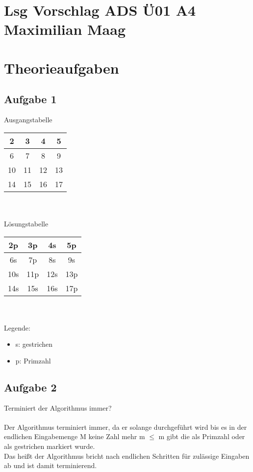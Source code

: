 \documentclass{article}
\begin{document}
	\section*{Lsg Vorschlag ADS Ü01 A4 Maximilian Maag}
	\section*{Theorieaufgaben}
	\subsection*{Aufgabe 1}
	Ausgangstabelle \\
	\begin{tabular}[h]{|c|c|c|c|}
		\hline
		2 & 3 & 4 & 5 \\
		\hline
		6 & 7 & 8 & 9 \\
		\hline
		10 & 11 & 12 & 13 \\
		\hline
		14 & 15 & 16 & 17 \\
		\hline
		
	\end{tabular} \\ \\

	Lösungstabelle \\
	\begin{tabular}[h]{|c|c|c|c|}
		\hline
		2p & 3p & 4s & 5p \\
		\hline
		6s & 7p & 8s & 9s \\
		\hline
		10s & 11p & 12s & 13p \\
		\hline
		14s & 15s & 16s & 17p \\
		\hline
		
	\end{tabular} \\ \\
	Legende: \\
	\begin{itemize}
		\item s: gestrichen
		\item p: Primzahl
	\end{itemize}
	\subsection*{Aufgabe 2}
	Terminiert der Algorithmus immer? \\ \\
	Der Algorithmus terminiert immer, da er solange durchgeführt wird bis es in der endlichen Eingabemenge M keine Zahl mehr m $\leq$ m gibt die als Primzahl oder als gestrichen markiert wurde. \\ 
	Das heißt der Algorithmus bricht nach endlichen Schritten für zulässige Eingaben ab und ist damit terminierend.\\
	
\end{document}
